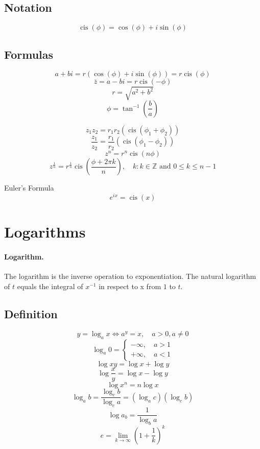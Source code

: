 \documentclass{book}
\DeclareMathOperator\cis{cis} %
\newcommand*\conj[1]{\bar{#1}}
\newcommand*\reciprocal[1]{\frac{1}{#1}}
\newcommand*\argument{\phi}
\newcommand*\integers{\mathbb{Z}}
\begin{document}
\subsection{Notation}
\[\cis \left ( \argument \right ) =  \cos \left ( \argument \right ) + i \sin \left ( \argument \right )\]

\subsection{Formulas}
\[a + bi = r \left( \cos \left ( \argument \right ) + i \sin \left ( \argument \right ) \right )
= r \cis \left ( \argument \right )\]
\[\conj{z} = a - bi = r \cis \left (- \argument \right)\]
\[r = \sqrt{a^2 + b^2}\]
\[\phi = \tan^{-1} \left ( \frac{b}{a} \right)\]

\[z_1 z_2 = r_1 r_2 \left ( \cis \left ( \phi_1 + \phi_2 \right ) \right )\]
\[\frac{z_1}{z_2} = \frac{r_1}{r_2} \left ( \cis \left ( \phi_1 - \phi_2 \right ) \right )\]
\[z^n = r^n \cis \left ( n \argument \right )\]
\[z^{\reciprocal{n}} = r^{\reciprocal{n}} \cis \left ( \frac{\argument + 2 \pi k}{n} \right ), \quad
k : k \in \integers \text{ and } 0 \le k \le n - 1\]

Euler's Formula
\[e^{ix} = \cis \left ( x \right)\]

\section{Logarithms}

\paragraph{Logarithm.} The logarithm is the inverse operation to exponentiation.
The natural logarithm of \(t\) equals the integral of \(x^{-1}\) in respect to x
from \(1\) to \(t\).

\subsection{Definition}

\[y = \log_a x \iff a^y = x, \quad a > 0, a \ne 0\]
\[\log_a 0 = \begin{cases} -\infty, \quad a > 1 \\ +\infty, \quad a < 1 \end{cases}\]
\[\log x y = \log x + \log y\]
\[\log \frac{x}{y} = \log x - \log y\]
\[\log x^n = n \log x\]
\[\log_a b = \frac{\log_c b}{\log_c a} = \left ( \log_a c \right ) \left ( \log_c b \right )\]
\[\log a_b = \reciprocal{\log_b a}\]
\[e=\lim_{k\to\infty} \left ( 1 + \reciprocal{k} \right ) ^ k\]
\end{document}
